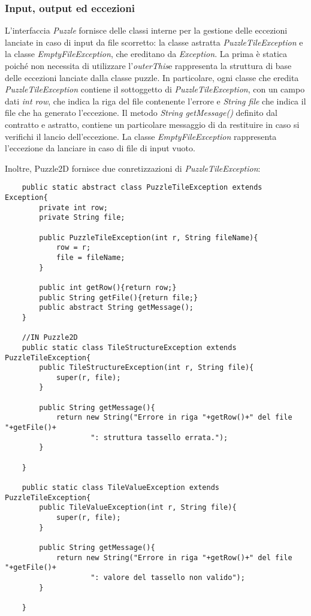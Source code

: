 \documentclass{article}
\begin{document}
\subsubsection{Input, output ed eccezioni}
L'interfaccia \textit{Puzzle} fornisce delle classi interne per la gestione delle eccezioni lanciate in caso di input da file scorretto: 
la classe astratta \textit{PuzzleTileException} e la classe \textit{EmptyFileException}, che ereditano da \textit{Exception}. La prima è statica poiché non necessita di utilizzare l'\textit{outerThis}e rappresenta la struttura di base delle eccezioni lanciate dalla classe puzzle. In particolare, ogni classe che eredita \textit{PuzzleTileException} contiene il sottoggetto di \textit{PuzzleTileException}, con un campo dati \textit{int row}, che indica la riga del file contenente l'errore e \textit{String file} che indica il file che ha generato l'eccezione. Il metodo \textit{String getMessage()} definito dal contratto e astratto, contiene un particolare messaggio di  da restituire in caso si verifichi il lancio dell'eccezione. La classe \textit{EmptyFileException} rappresenta l'eccezione da lanciare in caso di file di input vuoto.\par 
Inoltre, Puzzle2D fornisce due conretizzazioni di \textit{PuzzleTileException}:
\begin{lstlisting}
	public static abstract class PuzzleTileException extends Exception{
        private int row;
        private String file;

        public PuzzleTileException(int r, String fileName){
            row = r;
            file = fileName;
        }

        public int getRow(){return row;}
        public String getFile(){return file;}
        public abstract String getMessage();
    }

	//IN Puzzle2D
    public static class TileStructureException extends PuzzleTileException{
        public TileStructureException(int r, String file){
            super(r, file);
        }

        public String getMessage(){
            return new String("Errore in riga "+getRow()+" del file "+getFile()+
                    ": struttura tassello errata.");
        }

    }

    public static class TileValueException extends PuzzleTileException{
        public TileValueException(int r, String file){
            super(r, file);
        }

        public String getMessage(){
            return new String("Errore in riga "+getRow()+" del file "+getFile()+
                    ": valore del tassello non valido");
        }

    }
\end{lstlisting}
\end{document}
